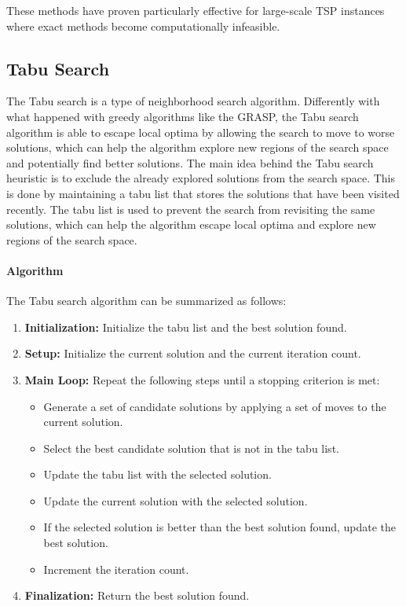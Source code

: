 \documentclass{article}
\begin{document}
These methods have proven particularly effective for large-scale TSP instances where exact methods become computationally infeasible.

\subsection{Tabu Search}
The Tabu search is a type of neighborhood search algorithm. 
Differently with what happened with greedy algorithms like the GRASP, the Tabu search algorithm is able to escape local optima by allowing the search to move to worse solutions,
which can help the algorithm explore new regions of the search space and potentially find better solutions.
The main idea behind the Tabu search heuristic is to exclude the already explored solutions from the search space. 
This is done by maintaining a tabu list that stores the solutions that have been visited recently. 
The tabu list is used to prevent the search from revisiting the same solutions, 
which can help the algorithm escape local optima and explore new regions of the search space\cite{Heuristics_for_the_Traveling_Salesman_Problem}.

\paragraph{Algorithm}
The Tabu search algorithm can be summarized as follows:
\begin{enumerate}
    \item \textbf{Initialization:} Initialize the tabu list and the best solution found.
    \item \textbf{Setup:} Initialize the current solution and the current iteration count.
    \item \textbf{Main Loop:} Repeat the following steps until a stopping criterion is met:
          \begin{itemize}
              \item Generate a set of candidate solutions by applying a set of moves to the current solution.
              \item Select the best candidate solution that is not in the tabu list.
              \item Update the tabu list with the selected solution.
              \item Update the current solution with the selected solution.
              \item If the selected solution is better than the best solution found, update the best solution.
              \item Increment the iteration count.
          \end{itemize}
    \item \textbf{Finalization:} Return the best solution found.
\end{enumerate}
\end{document}
